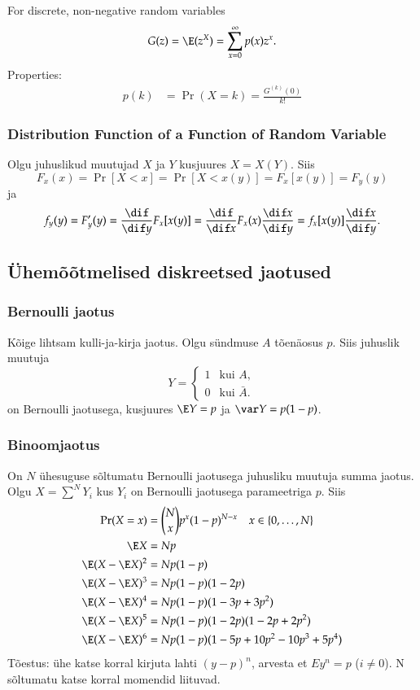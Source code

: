 \documentclass[a4paper]{article}
\numberwithin{equation}{subsection}
\begin{document}
For discrete, non-negative random variables
\begin{equation}
  G(z) = \E (z^X) = \sum_{x=0}^{\infty}p(x)z^x.
\end{equation}
Properties:
\begin{align}
  p(k) &= \operatorname{Pr}(X = k) = \frac{G^{(k)}(0)}{k!}
\end{align}

\subsubsection{Distribution Function of a Function of Random Variable}
Olgu juhuslikud muutujad $X$ ja $Y$ kusjuures $X=X(Y)$.  Siis
\begin{equation}
  F_x(x) = \Pr[X < x] = \Pr[X < x(y)] = F_x[x(y)] = F_y(y)
\end{equation}
ja
\begin{equation}
  f_y(y) = F_y'(y) = \frac{\dif}{\dif y} F_x[x(y)] =
  \frac{\dif}{\dif x} F_x(x) \frac{\dif x}{\dif y} = f_x[x(y)]
  \frac{\dif x}{\dif y}. 
\end{equation}


\subsection{Ühemõõtmelised diskreetsed jaotused}

\subsubsection{Bernoulli jaotus}
Kõige lihtsam kulli-ja-kirja jaotus.  Olgu sündmuse $A$ tõenäosus
$p$.  Siis juhuslik muutuja
\begin{equation}
  Y = 
  \begin{cases}
    1 & \text{kui $A$},\\
    0 & \text{kui $\bar A$.}
  \end{cases}
\end{equation}
on Bernoulli jaotusega, kusjuures $\E Y = p$ ja $\var Y = p(1-p)$.

\subsubsection{Binoomjaotus}
On $N$ ühesuguse sõltumatu Bernoulli jaotusega juhusliku muutuja summa
jaotus.  Olgu $X = \sum^N Y_i$ kus $Y_i$ on Bernoulli jaotusega
parameetriga $p$.  Siis
\begin{align*}
  \Pr(X = x) &= \binom{N}{x} p^x (1-p)^{N-x} \quad x\in \{0, \ldots ,N\}
  \\
  \E X &= Np \\
\E ( X - \E X)^2 &= N p( 1 - p) \\
\E ( X - \E X)^3 &= N p( 1 - p)( 1 - 2p)\\
\E ( X - \E X)^4 &= N p( 1 - p)( 1 - 3p + 3p^{2})
\\
\E ( X - \E X)^5 &= N p( 1 - p)(1 - 2p)( 1 - 2p + 2p^{2})
\\
\E ( X - \E X)^6 &= N p( 1 - p) (1 - 5p + 10p^2 - 10p^3 + 5p^4)
\end{align*}
Tõestus: ühe katse korral kirjuta lahti $(y-p)^n$, arvesta et $Ey^n=p$
($i\not=0$).  N sõltumatu katse korral momendid liituvad.
\end{document}
